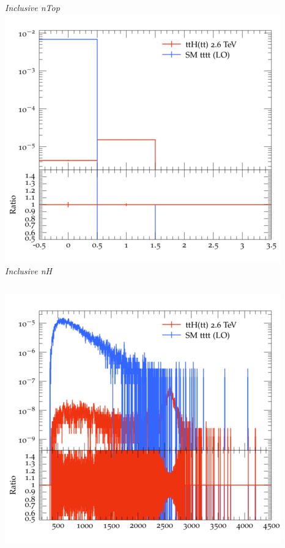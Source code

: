\documentclass{beamer}
\begin{document}
\begin{frame}
\begin{columns}
\textit{\small Inclusive nTop}
\includegraphics[width=\textwidth]{../plots/ttH_2600/tttt_ttH/Inclusive_nH.png}\\
\textit{\small Inclusive nH}
\end{columns}
\begin{columns}
\includegraphics[width=\textwidth]{../plots/ttH_2600/tttt_ttH/Inclusive_InvM_ttbar12.png}\\

\end{columns}
\end{frame}
\end{document}
